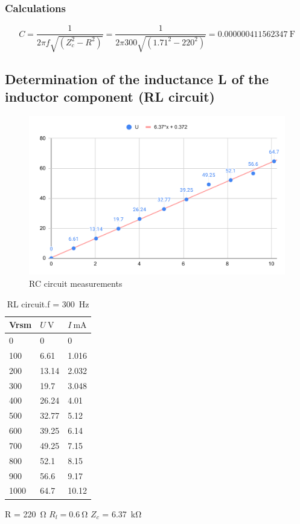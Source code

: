 \subsubsection*{Calculations}

\begin{equation}
C = \frac{1}{2\pi f \sqrt{(Z_c^2 - R^2)}} =
 \frac{1}{2\pi 300 \sqrt{(1.71^2 - 220^2)}} =
 0.000000411562347 \SI{}{\farad}
\end{equation}






\subsection{Determination of the inductance L of the inductor component (RL circuit)}

\begin{figure}[H]
	\centering
	\includegraphics[width=14cm]{schematics/inductor.pdf}
	\caption{RC circuit measurements }
	\label{fig:inductance}
\end{figure}


\begin{table}[!ht]
    \centering
    \begin{tabular}{l|l|l}
        Vrsm & $U \SI{}{\volt}$ & $I \SI{}{\milli\ampere}$ \\ \hline
        0 & 0 & 0 \\ 
        100 & 6.61 & 1.016 \\ 
        200 & 13.14 & 2.032 \\ 
        300 & 19.7 & 3.048 \\ 
        400 & 26.24 & 4.01 \\ 
        500 & 32.77 & 5.12 \\ 
        600 & 39.25 & 6.14 \\ 
        700 & 49.25 & 7.15 \\ 
        800 & 52.1 & 8.15 \\ 
        900 & 56.6 & 9.17 \\ 
        1000 & 64.7 & 10.12 \\ 
    \end{tabular}
    \caption{RL circuit.f = \SI{300}{\hertz}} R = \SI{220}{\ohm} $R_l = \SI{0.6}{\ohm}$ $Z_c$ = \SI{6.37}{\kilo\ohm}
    \label{tab:capacitance}\end{table}

